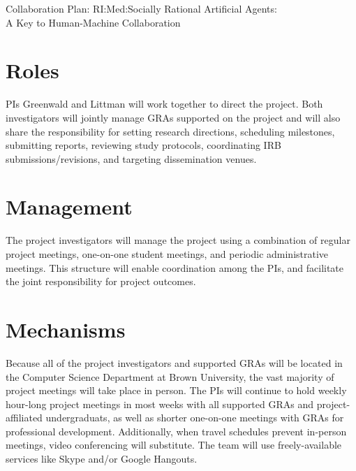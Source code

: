 \documentclass[11pt,letterpaper]{article}
\begin{document}

\begin{center}
{\Large Collaboration Plan: RI:Med:Socially Rational Artificial Agents: \\ \vspace{.5ex} A Key to Human-Machine Collaboration}
\end{center}

\section*{Roles}

PIs Greenwald and Littman will work together to direct the
project. Both investigators will jointly manage GRAs supported on the
project and will also share the responsibility for setting research
directions, scheduling milestones, submitting reports, reviewing study
protocols, coordinating IRB submissions/revisions, and targeting
dissemination venues.

\section*{Management}

The project investigators will manage the project using a combination of
regular project meetings, one-on-one student meetings, and periodic
administrative meetings. This structure will enable coordination among the PIs,
and facilitate the joint responsibility for project outcomes. 

\section*{Mechanisms}

Because all of the project investigators and supported GRAs will be
located in the Computer Science Department at Brown University, the
vast majority of project meetings will take place in person. The PIs
will continue to hold weekly hour-long project meetings in most weeks
with all supported GRAs and project-affiliated undergraduats, as well
as shorter one-on-one meetings with GRAs for professional
development. Additionally, when travel schedules prevent in-person
meetings, video conferencing will substitute. The team will use
freely-available services like Skype and/or Google Hangouts.
\end{document}
